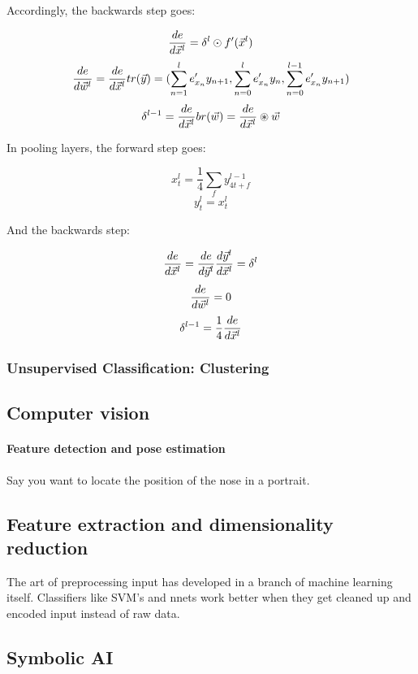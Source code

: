 Accordingly, the backwards step goes:

$$  \frac{ \mathop{de} }{ \mathop{d\vec{x}^l} }  = \delta^l \odot f'(\vec{x}^l) $$
$$  \frac{ \mathop{de} }{ \mathop{d\vec{w}^l} }  =  \frac{ \mathop{de} }{ \mathop{d\vec{x}^l} }  tr(\vec{y}) = (\sum_{n=1}^l e'_{x_n} y_{n+1}, \sum_{n=0}^l e'_{x_n} y_n, \sum_{n=0}^{l-1} e'_{x_n} y_{n+1}) $$
$$ \delta^{l-1} =  \frac{ \mathop{de} }{ \mathop{d\vec{x}^l} }  br(\vec{w}) =  \frac{ \mathop{de} }{ \mathop{d\vec{x}^l} }  \circledast \vec{w} $$

In pooling layers, the forward step goes: 

$$ x_t^l = \frac{1}{4} \sum_f y_{4t + f}^{l-1} $$
$$ y_t^l = x_t^l $$

And the  backwards step: 

$$  \frac{ \mathop{de} }{ \mathop{d\vec{x}^l} }  =  \frac{ \mathop{de} }{ \mathop{d\vec{y}^l} }   \frac{ \mathop{d\vec{y}^l} }{ \mathop{d\vec{x}^l} }   = \delta^l  $$
$$  \frac{ \mathop{de} }{ \mathop{d\vec{w}^l} }  = 0 $$
$$ \delta^{l-1} = \frac{1}{4}  \frac{ \mathop{de} }{ \mathop{d\vec{x}^l} }   $$



\subsubsection{Unsupervised Classification: Clustering}


\subsection{Computer vision}

\paragraph{Feature detection and pose estimation}

Say you want to locate the position of the nose in a portrait. 



\subsection{Feature extraction and dimensionality reduction}
The art of preprocessing input has developed in a branch of machine learning itself. Classifiers like SVM's and nnets work better when they get cleaned up and encoded input instead of raw data. 



\subsection{Symbolic AI}

